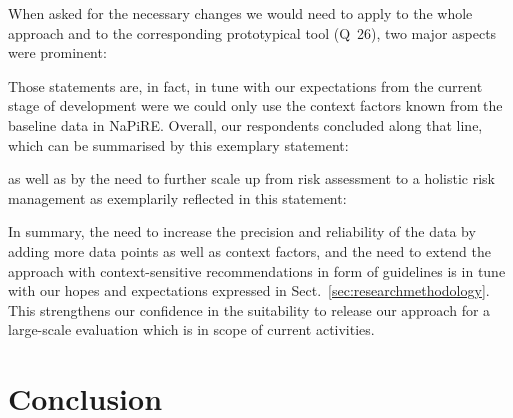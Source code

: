 \documentclass[lnbip]{svmultln}
\begin{document}
When asked for the necessary changes we would need to apply to the whole approach and to the corresponding prototypical tool (Q~26), two major aspects were prominent:
\begin{center}
\setlength\fboxsep{0pt}
  \setlength\fboxrule{0pt}
\colorbox{lightgray}{
}
\end{center}
Those statements are, in fact, in tune with our expectations from the current stage of development were we could only use the context factors known from the baseline data in NaPiRE. Overall, our respondents concluded along that line, which can be summarised by this exemplary statement:
\begin{center}
\setlength\fboxsep{0pt}
  \setlength\fboxrule{0pt}
\colorbox{lightgray}{
}
\end{center}
as well as by the need to further scale up from risk assessment to a holistic risk management as exemplarily reflected in this statement:
\begin{center}
\setlength\fboxsep{0pt}
  \setlength\fboxrule{0pt}
\colorbox{lightgray}{
}
\end{center}

In summary, the need to increase the precision and reliability of the data by adding more data points as well as context factors, and the need to extend the approach with context-sensitive recommendations in form of guidelines is in tune with our hopes and expectations expressed in Sect.~\ref{sec:researchmethodology}. This strengthens our confidence in the suitability to release our approach for a large-scale evaluation which is in scope of current activities.


\section{Conclusion}
\label{sec:conclusion}
\end{document}
